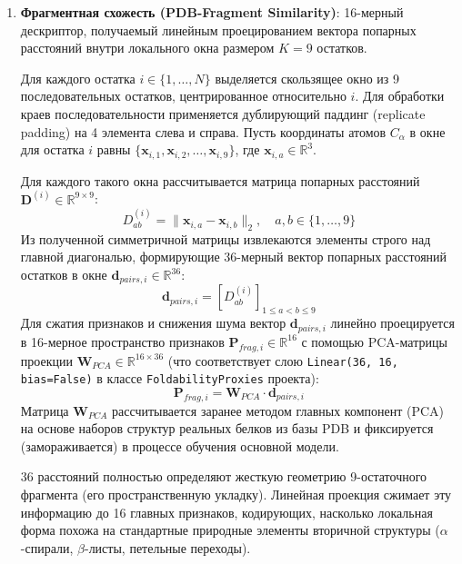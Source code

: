 \documentclass[12pt, a4paper]{article}
\begin{document}
\begin{enumerate}
    \item \textbf{Фрагментная схожесть (PDB-Fragment Similarity)}: 16-мерный дескриптор, получаемый линейным проецированием вектора попарных расстояний внутри локального окна размером $K=9$ остатков.

    Для каждого остатка $i \in \{1, \dots, N\}$ выделяется скользящее окно из 9 последовательных остатков, центрированное относительно $i$. Для обработки краев последовательности применяется дублирующий паддинг (replicate padding) на 4 элемента слева и справа. Пусть координаты атомов $C_\alpha$ в окне для остатка $i$ равны $\{\mathbf{x}_{i, 1}, \mathbf{x}_{i, 2}, \dots, \mathbf{x}_{i, 9}\}$, где $\mathbf{x}_{i, a} \in \mathbb{R}^3$.

    Для каждого такого окна рассчитывается матрица попарных расстояний $\mathbf{D}^{(i)} \in \mathbb{R}^{9 \times 9}$:
    \begin{equation}
        D^{(i)}_{ab} = \|\mathbf{x}_{i, a} - \mathbf{x}_{i, b}\|_2, \quad a, b \in \{1, \dots, 9\}
    \end{equation}
    Из полученной симметричной матрицы извлекаются элементы строго над главной диагональю, формирующие 36-мерный вектор попарных расстояний остатков в окне $\mathbf{d}_{pairs, i} \in \mathbb{R}^{36}$:
    \begin{equation}
        \mathbf{d}_{pairs, i} = \left[ D^{(i)}_{ab} \right]_{1 \le a < b \le 9}
    \end{equation}
    Для сжатия признаков и снижения шума вектор $\mathbf{d}_{pairs, i}$ линейно проецируется в 16-мерное пространство признаков $\mathbf{P}_{frag, i} \in \mathbb{R}^{16}$ с помощью PCA-матрицы проекции $\mathbf{W}_{PCA} \in \mathbb{R}^{16 \times 36}$ (что соответствует слою \texttt{Linear(36, 16, bias=False)} в классе \texttt{FoldabilityProxies} проекта):
    \begin{equation}
        \mathbf{P}_{frag, i} = \mathbf{W}_{PCA} \cdot \mathbf{d}_{pairs, i}
    \end{equation}
    Матрица $\mathbf{W}_{PCA}$ рассчитывается заранее методом главных компонент (PCA) на основе наборов структур реальных белков из базы PDB и фиксируется (замораживается) в процессе обучения основной модели.

    36 расстояний полностью определяют жесткую геометрию 9-остаточного фрагмента (его пространственную укладку). Линейная проекция сжимает эту информацию до 16 главных признаков, кодирующих, насколько локальная форма похожа на стандартные природные элементы вторичной структуры ($\alpha$-спирали, $\beta$-листы, петельные переходы).


\end{enumerate}
\end{document}
